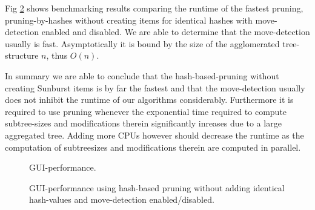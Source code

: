 Fig \ref{fig:gui-performance-movedet} shows benchmarking results comparing the runtime of the fastest pruning, pruning-by-hashes without creating items for identical hashes with move-detection enabled and disabled. We are able to determine that the move-detection usually is fast. Asymptotically it is bound by the size of the agglomerated tree-structure $n$, thus $O(n)$.

In summary we are able to conclude that the hash-based-pruning without creating Sunburst items is by far the fastest and that the move-detection usually does not inhibit the runtime of our algorithms considerably. Furthermore it is required to use pruning whenever the exponential time required to compute subtree-sizes and modifications therein significantly inreases due to a large aggregated tree. Adding more CPUs however should decrease the runtime as the computation of subtreesizes and modifications therein are computed in parallel.

\begin{figure}[tb]
\caption{\label{fig:gui-performance} GUI-performance.}
\end{figure}

\begin{figure}[tb]
\caption{\label{fig:gui-performance-movedet} GUI-performance using hash-based pruning without adding identical hash-values and move-detection enabled/disabled.}
\end{figure}

